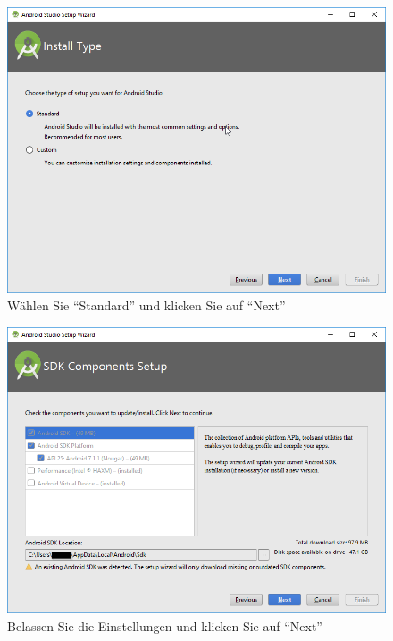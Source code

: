 \documentclass[a4paper,10pt,xetex]{article}
\begin{document}
\begin{figure}
  \centering
  \includegraphics[width=\textwidth]{Installation/1-11}
  \caption{Wählen Sie ``Standard'' und klicken Sie auf ``Next''}
\end{figure}

\begin{figure}
  \centering
  \includegraphics[width=\textwidth]{Installation/1-12}
  \caption{Belassen Sie die Einstellungen und klicken Sie auf ``Next''}
\end{figure}
\end{document}
